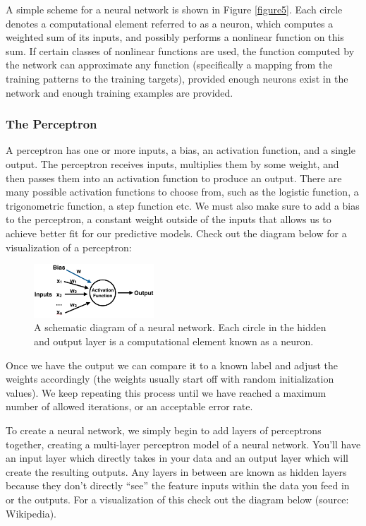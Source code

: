 \documentclass[12pt]{article}
\numberwithin{equation}{section}
\numberwithin{table}{section}
\numberwithin{figure}{section}
\begin{document}
A simple scheme for a neural network is shown in Figure \ref{figure5}. Each circle denotes a computational element referred to as a neuron, which computes a weighted sum of its inputs, and possibly performs a nonlinear function on this sum. If certain classes of nonlinear functions are used, the function computed by the network can approximate any function (specifically a mapping from the training patterns to the training targets), provided enough neurons exist in the network and enough training examples are provided.


\subsubsection{The Perceptron} \label{perc}

A perceptron has one or more inputs, a bias, an activation function, and a single output. The perceptron receives inputs, multiplies them by some weight, and then passes them into an activation function to produce an output. There are many possible activation functions to choose from, such as the logistic function, a trigonometric function, a step function etc. We must also make sure to add a bias to the perceptron, a constant weight outside of the inputs that allows us to achieve better fit for our predictive models. Check out the diagram below for a visualization of a perceptron:

\begin{figure}[H] \centering
	\includegraphics[width=0.4\textwidth]{perceptron.png}
	\caption{A schematic diagram of a neural network. Each circle in the hidden and output layer is a computational element known as a neuron. }
	\label{perceptron}
\end{figure}

Once we have the output we can compare it to a known label and adjust the weights accordingly (the weights usually start off with random initialization values). We keep repeating this process until we have reached a maximum number of allowed iterations, or an acceptable error rate.

To create a neural network, we simply begin to add layers of perceptrons together, creating a multi-layer perceptron model of a neural network. You’ll have an input layer which directly takes in your data and an output layer which will create the resulting outputs. Any layers in between are known as hidden layers because they don’t directly “see” the feature inputs within the data you feed in or the outputs. For a visualization of this check out the diagram below (source: Wikipedia).
\end{document}
